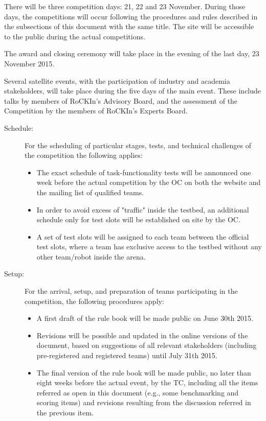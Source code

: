 There will be three competition days: 21, 22 and 23 November. During those days, the competitions will occur following the procedures and rules described in the subsections of this document with the same title. The site will be accessible to the public during the actual competitions.

The award and closing ceremony will take place in the evening of the last day, 23 November 2015.

Several satellite events, with the participation of industry and academia stakeholders, will take place during the five days of the main event. These include talks by members of RoCKIn's Advisory Board, and the assessment of the Competition by the members of RoCKIn's Experts Board.


\noindent
\begin{description}
	\item[Schedule:] For the scheduling of particular stages, tests, and technical challenges of the competition the following applies:
	\begin{itemize}
	  	\item The exact schedule of task-functionality tests will be announced one week before the actual competition by the OC on both the website and the mailing list of qualified teams.
	  	\item In order to avoid excess of "traffic" inside the testbed, an additional schedule only for test slots will be established on site by the OC.
	  	\item A set of test slots will be assigned to each team between the official test slots, where a team has exclusive access to the testbed without any other team/robot inside the arena.
	\end{itemize}
	\item[Setup:] For the arrival, setup, and preparation of teams participating in the competition, the following procedures apply: 
	\begin{itemize}
	  	\item A first draft of the rule book will be made public on June 30th 2015.
		\item Revisions will be possible and updated in the online versions of the document, based on suggestions of all relevant stakeholders (including pre-registered and registered teams) until July 31th 2015.
		\item The final version of the rule book will be made public, no later than eight weeks before the actual event, by the TC, including all the items referred as open in this document (e.g., some benchmarking and scoring items) and revisions resulting from the discussion referred in the previous item.

\end{itemize}
\end{description}

